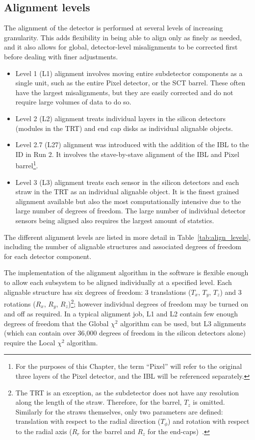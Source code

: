 \subsection{Alignment levels}\label{align:levels}
The alignment of the detector is performed at several levels of increasing granularity.
This adds flexibility in being able to align only as finely as needed, and it also allows for global, detector-level misalignments to be corrected first before dealing with finer adjustments.
\begin{itemize}%
\item Level 1 (L1) alignment involves moving entire subdetector components as a single unit, such as the entire Pixel detector, or the SCT barrel.  These often have the largest misalignments, but they are easily corrected and do not require large volumes of data to do so.
\item Level 2 (L2) alignment treats individual layers in the silicon detectors (modules in the TRT) and end cap disks as individual alignable objects.
\item Level 2.7 (L27) alignment was introduced with the addition of the IBL to the ID in Run 2.  It involves the stave-by-stave alignment of the IBL and Pixel barrel\footnote{For the purposes of this Chapter, the term ``Pixel'' will refer to the original three layers of the Pixel detector, and the IBL will be referenced separately.}.
\item Level 3 (L3) alignment treats each sensor in the silicon detectors and each straw in the TRT as an individual alignable object.  It is the finest grained alignment available but also the most computationally intensive due to the large number of degrees of freedom.  The large number of individual detector sensors being aligned also requires the largest amount of statstics.
\end{itemize}
The different alignment levels are listed in more detail in Table~\ref{tab:align_levels}, including the number of alignable structures and associated degrees of freedom for each detector component.

The implementation of the alignment algorithm in the software is flexible enough to allow each subsystem to be aligned individually at a specified level.
Each alignable structure has six degrees of freedom: 3 translations ($T_x$, $T_y$, $T_z$) and 3 rotations ($R_x$, $R_y$, $R_z$)\footnote{The TRT is an exception, as the subdetector does not have any resolution along the length of the straw.  Therefore, for the barrel, $T_z$ is omitted.  Similarly for the straws themselves, only two parameters are defined: translation with respect to the radial direction ($T_\phi$) and rotation with respect to the radial axis ($R_r$ for the barrel and $R_z$ for the end-caps)~\cite{2012.johnda-thesis}.}; however individual degrees of freedom may be turned on and off as required.
In a typical alignment job, L1 and L2 contain few enough degrees of freedom that the Global $\chi^2$ algorithm can be used, but L3 alignments (which can contain over 36,000 degrees of freedom in the silicon detectors alone) require the Local $\chi^2$ algorithm.

